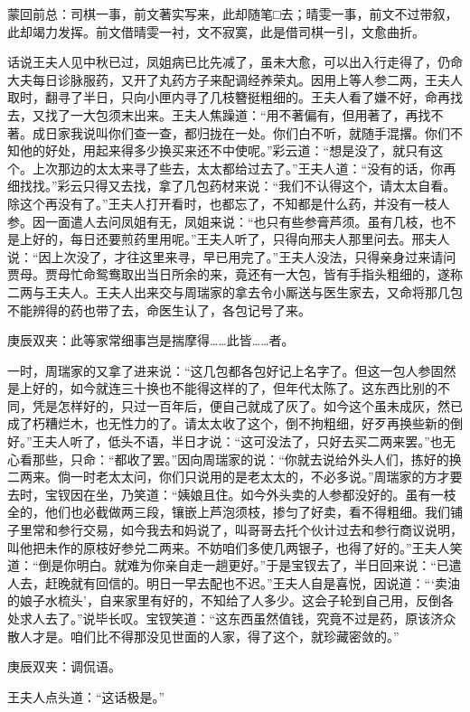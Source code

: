 

\begin{parag}
    \begin{note}蒙回前总：司棋一事，前文著实写来，此却随笔□去；晴雯一事，前文不过带叙，此却竭力发挥。前文借晴雯一衬，文不寂寞，此是借司棋一引，文愈曲折。\end{note}
\end{parag}


\begin{parag}
    话说王夫人见中秋已过，凤姐病已比先减了，虽未大愈，可以出入行走得了，仍命大夫每日诊脉服药，又开了丸药方子来配调经养荣丸。因用上等人参二两，王夫人取时，翻寻了半日，只向小匣内寻了几枝簪挺粗细的。王夫人看了嫌不好，命再找去，又找了一大包须末出来。王夫人焦躁道：“用不著偏有，但用著了，再找不著。成日家我说叫你们查一查，都归拢在一处。你们白不听，就随手混撂。你们不知他的好处，用起来得多少换买来还不中使呢。”彩云道：“想是没了，就只有这个。上次那边的太太来寻了些去，太太都给过去了。”王夫人道：“没有的话，你再细找找。”彩云只得又去找，拿了几包药材来说：“我们不认得这个，请太太自看。除这个再没有了。”王夫人打开看时，也都忘了，不知都是什么药，并没有一枝人参。因一面遣人去问凤姐有无，凤姐来说：“也只有些参膏芦须。虽有几枝，也不是上好的，每日还要煎药里用呢。”王夫人听了，只得向邢夫人那里问去。邢夫人说：“因上次没了，才往这里来寻，早已用完了。”王夫人没法，只得亲身过来请问贾母。贾母忙命鸳鸯取出当日所余的来，竟还有一大包，皆有手指头粗细的，遂称二两与王夫人。王夫人出来交与周瑞家的拿去令小厮送与医生家去，又命将那几包不能辨得的药也带了去，命医生认了，各包记号了来。\begin{note}庚辰双夹：此等家常细事岂是揣摩得……此皆……者。\end{note}
\end{parag}


\begin{parag}
    一时，周瑞家的又拿了进来说：“这几包都各包好记上名字了。但这一包人参固然是上好的，如今就连三十换也不能得这样的了，但年代太陈了。这东西比别的不同，凭是怎样好的，只过一百年后，便自己就成了灰了。如今这个虽未成灰，然已成了朽糟烂木，也无性力的了。请太太收了这个，倒不拘粗细，好歹再换些新的倒好。”王夫人听了，低头不语，半日才说：“这可没法了，只好去买二两来罢。”也无心看那些，只命：“都收了罢。”因向周瑞家的说：“你就去说给外头人们，拣好的换二两来。倘一时老太太问，你们只说用的是老太太的，不必多说。”周瑞家的方才要去时，宝钗因在坐，乃笑道：“姨娘且住。如今外头卖的人参都没好的。虽有一枝全的，他们也必截做两三段，镶嵌上芦泡须枝，掺匀了好卖，看不得粗细。我们铺子里常和参行交易，如今我去和妈说了，叫哥哥去托个伙计过去和参行商议说明，叫他把未作的原枝好参兑二两来。不妨咱们多使几两银子，也得了好的。”王夫人笑道：“倒是你明白。就难为你亲自走一趟更好。”于是宝钗去了，半日回来说：“已遣人去，赶晚就有回信的。明日一早去配也不迟。”王夫人自是喜悦，因说道：“‘卖油的娘子水梳头’，自来家里有好的，不知给了人多少。这会子轮到自己用，反倒各处求人去了。”说毕长叹。宝钗笑道：“这东西虽然值钱，究竟不过是药，原该济众散人才是。咱们比不得那没见世面的人家，得了这个，就珍藏密敛的。”\begin{note}庚辰双夹：调侃语。\end{note}王夫人点头道：“这话极是。”
\end{parag}


